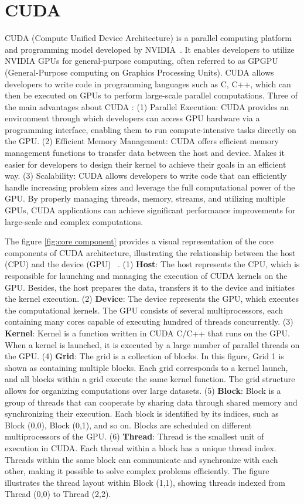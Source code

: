 \documentclass[PhD]{PHlab-thesis}
\begin{document}
\section{CUDA}
CUDA (Compute Unified Device Architecture) is a parallel computing platform and programming model developed by NVIDIA~\cite{CUDA}. It enables developers to utilize NVIDIA GPUs for general-purpose computing, often referred to as GPGPU (General-Purpose computing on Graphics Processing Units). CUDA allows developers to write code in programming languages such as C, C++, which can then be executed on GPUs to perform large-scale parallel computations.\newline
Three of the main advantages about CUDA : (1) Parallel Execution: CUDA provides an environment through which developers can access GPU hardware via a programming interface, enabling them to run compute-intensive tasks directly on the GPU. (2) Efficient Memory Management: CUDA offers efficient memory management functions to transfer data between the host and device. Makes it easier for developers to design their kernel to achieve their goals in an efficient way. (3) Scalability: CUDA allows developers to write code that can efficiently handle increasing problem sizes and leverage the full computational power of the GPU. By properly managing threads, memory, streams, and utilizing multiple GPUs, CUDA applications can achieve significant performance improvements for large-scale and complex computations.  

The figure \ref{fig:core component} provides a visual representation of the core components of CUDA architecture, illustrating the relationship between the host (CPU) and the device (GPU) ~\cite{CUDA}. (1) \textbf{Host}: The host represents the CPU, which is responsible for launching and managing the execution of CUDA kernels on the GPU. Besides, the host prepares the data, transfers it to the device and initiates the kernel execution. (2) \textbf{Device}: The device represents the GPU, which executes the computational kernels. The GPU consists of several multiprocessors, each containing many cores capable of executing hundred of threads concurrently. (3) \textbf{Kernel}: Kernel is a function written in CUDA C/C++ that runs on the GPU. When a kernel is launched, it is executed by a large number of parallel threads on the GPU. (4) \textbf{Grid}: The grid is a collection of blocks. In this figure, Grid 1 is shown as containing multiple blocks. Each grid corresponds to a kernel launch, and all blocks within a grid execute the same kernel function. The grid structure allows for organizing computations over large datasets. (5) \textbf{Block}: Block is a group of threads that can cooperate by sharing data through shared memory and synchronizing their execution. Each block is identified by its indices, such as Block (0,0), Block (0,1), and so on. Blocks are scheduled on different multiprocessors of the GPU. (6) \textbf{Thread}: Thread is the smallest unit of execution in CUDA. Each thread within a block has a unique thread index. Threads within the same block can communicate and synchronize with each other, making it possible to solve complex problems efficiently. The figure illustrates the thread layout within Block (1,1), showing threads indexed from Thread (0,0) to Thread (2,2).
\end{document}
